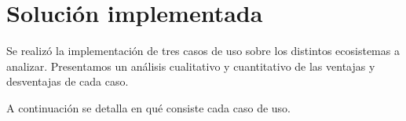 \section{Solución implementada}

Se realizó la implementación de tres casos de uso sobre los distintos ecosistemas a analizar. Presentamos un análisis cualitativo y cuantitativo de las ventajas y desventajas de cada caso.

A continuación se detalla en qué consiste cada caso de uso.




